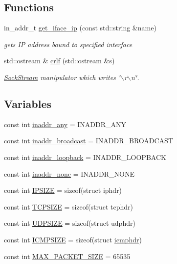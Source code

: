 \subsection*{Functions}
\begin{CompactItemize}
\item 
in\_\-addr\_\-t \hyperlink{namespacesocketpp_e04237b3f443ecc14051f52a59450692}{get\_\-iface\_\-ip} (const std::string \&name)
\begin{CompactList}\small\item\em gets IP address bound to specified interface \item\end{CompactList}\item 
std::ostream \& \hyperlink{namespacesocketpp_0c17a8fc8340bca21992d92cf17f8df5}{crlf} (std::ostream \&s)
\begin{CompactList}\small\item\em \hyperlink{classsocketpp_1_1SockStream}{SockStream} manipulator which writes \char`\"{}$\backslash$r$\backslash$n\char`\"{}. \item\end{CompactList}\end{CompactItemize}
\subsection*{Variables}
\begin{CompactItemize}
\item 
const int \hyperlink{namespacesocketpp_5200e43bde971e8003068a622cba2f58}{inaddr\_\-any} = INADDR\_\-ANY
\item 
const int \hyperlink{namespacesocketpp_733551c5151802fc12691a868a366a5f}{inaddr\_\-broadcast} = INADDR\_\-BROADCAST
\item 
const int \hyperlink{namespacesocketpp_8a9e04cf907ec163f43cf6c3bf9e213c}{inaddr\_\-loopback} = INADDR\_\-LOOPBACK
\item 
const int \hyperlink{namespacesocketpp_26bb72049a9cf272f6c116b0a2187c0b}{inaddr\_\-none} = INADDR\_\-NONE
\item 
const int \hyperlink{namespacesocketpp_1beda002d2e23bf757355444fd9279e2}{IPSIZE} = sizeof(struct iphdr)
\item 
const int \hyperlink{namespacesocketpp_34c3bb51b882d2ae59d483d1e8faeebd}{TCPSIZE} = sizeof(struct tcphdr)
\item 
const int \hyperlink{namespacesocketpp_1c4f449aef7a6c706b546343c4d16dd3}{UDPSIZE} = sizeof(struct udphdr)
\item 
const int \hyperlink{namespacesocketpp_fa361b148e87f58b86a95abc48e281fb}{ICMPSIZE} = sizeof(struct \hyperlink{structsocketpp_1_1icmphdr}{icmphdr})
\item 
const int \hyperlink{namespacesocketpp_11f9a39ced6614326ba993c3245d8912}{MAX\_\-PACKET\_\-SIZE} = 65535
\end{CompactItemize}



